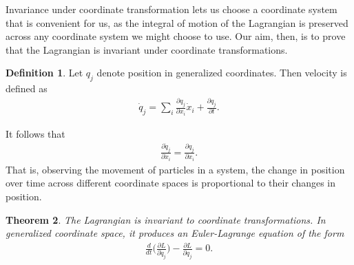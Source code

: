 \documentclass[10.5pt, psamsfonts]{amsart}
\newtheorem{thm}{Theorem}[section]
\theoremstyle{definition}
\newtheorem{defn}[thm]{Definition}
\theoremstyle{remark}
\numberwithin{equation}{section}
\begin{document}
Invariance under coordinate transformation lets us choose a coordinate system that is convenient for us, as the integral of motion of the Lagrangian is preserved across any coordinate system we might choose to use. Our aim, then, is to prove that the Lagrangian is invariant under coordinate transformations.

\begin{defn}
Let $q_j$ denote position in generalized coordinates. Then velocity is defined as
\begin{align}
  \label{eq:Formal Velocity}
  \dot{q}_j = \sum_i \frac{\partial q_j}{\partial x_i} \dot{x}_i + \frac{\partial q_j}{\partial t}. 
\end{align}
\end{defn}
\noindent It follows that
\begin{align}
  \label{eq:Proportionality}
  \frac{\partial \dot{q}_j}{\partial \dot{x}_i} = \frac{\partial q_j}{\partial x_i}.
\end{align}
That is, observing the movement of particles in a system, the change in position over time across different coordinate spaces is proportional to their changes in position.

\begin{thm}
  The Lagrangian is invariant to coordinate transformations. In generalized coordinate space, it produces an Euler-Lagrange equation of the form
  \begin{align*}
    \frac{d}{dt} \bigg( \frac{\partial L}{\partial \dot{q}_j}  \bigg) - \frac{\partial L }{\partial q_j} = 0.
  \end{align*}
\end{thm}
\end{document}
